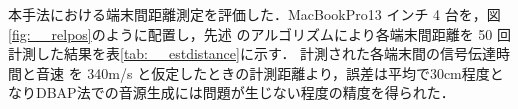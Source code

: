 本手法における端末間距離測定を評価した．MacBookPro13 インチ 4 台を，図\ref{fig:__relpos}のように配置し，先述 のアルゴリズムにより各端末間距離を 50 回計測した結果を表\ref{tab:__estdistance}に示す．
計測された各端末間の信号伝達時間と音速 を 340m/s と仮定したときの計測距離より，誤差は平均で30cm程度となりDBAP法での音源生成には問題が生じない程度の精度を得られた．
